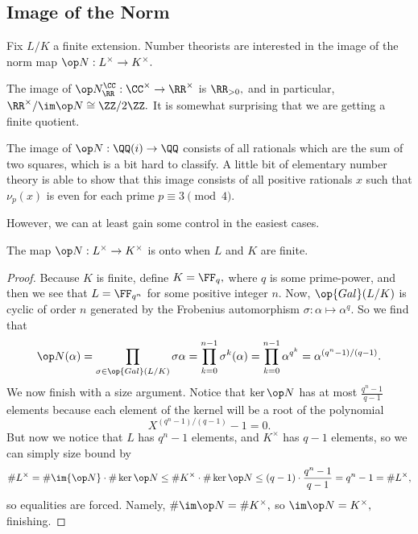 \subsection{Image of the Norm}
Fix $L/K$ a finite extension. Number theorists are interested in the image of the norm map $\op N:L^\times\to K^\times.$
\begin{example}
	The image of $\op N^\CC_\RR:\CC^\times\to\RR^\times$ is $\RR_{>0},$ and in particular, $\RR^\times/\im\op N\cong\ZZ/2\ZZ.$ It is somewhat surprising that we are getting a finite quotient.
\end{example}
\begin{example}
	The image of $\op N:\QQ(i)\to\QQ$ consists of all rationals which are the sum of two squares, which is a bit hard to classify. A little bit of elementary number theory is able to show that this image consists of all positive rationals $x$ such that $\nu_p(x)$ is even for each prime $p\equiv3\pmod4.$
\end{example}
However, we can at least gain some control in the easiest cases.
\begin{exe}
	The map $\op N:L^\times\to K^\times$ is onto when $L$ and $K$ are finite.
\end{exe}
\begin{proof}
	Because $K$ is finite, define $K=\FF_q,$ where $q$ is some prime-power, and then we see that $L=\FF_{q^n}$ for some positive integer $n.$ Now, $\op{Gal}(L/K)$ is cyclic of order $n$ generated by the Frobenius automorphism $\sigma:\alpha\mapsto\alpha^q.$ So we find that
	\[\op N(\alpha)=\prod_{\sigma\in\op{Gal}(L/K)}\sigma\alpha=\prod_{k=0}^{n-1}\sigma^k(\alpha)=\prod_{k=0}^{n-1}\alpha^{q^k}=\alpha^{\left(q^n-1\right)/(q-1)}.\]
	We now finish with a size argument. Notice that $\ker\op N$ has at most $\frac{q^n-1}{q-1}$ elements because each element of the kernel will be a root of the polynomial
	\[X^{\left(q^n-1\right)/(q-1)}-1=0.\]
	But now we notice that $L$ has $q^n-1$ elements, and $K^\times$ has $q-1$ elements, so we can simply size bound by
	\[\#L^\times=\#\im{\op N}\cdot\#\ker\op N\le\#K^\times\cdot\#\ker\op N\le(q-1)\cdot\frac{q^n-1}{q-1}=q^n-1=\#L^\times,\]
	so equalities are forced. Namely, $\#\im\op N=\#K^\times,$ so $\im\op N=K^\times,$ finishing.
\end{proof}

